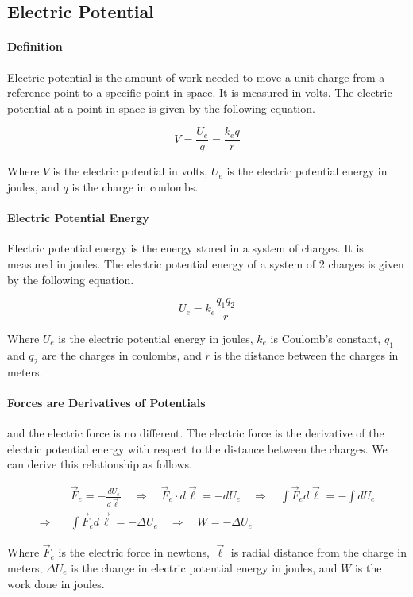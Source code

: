 \subsection{Electric Potential}
\hrulefill

\paragraph*{Definition}
Electric potential is the amount of work needed to move a unit charge from a reference point to a specific point in space.
It is measured in volts. The electric potential at a point in space is given by the following equation.

\begin{equation*}
    V = \frac{U_e}{q} = \frac{k_eq}{r}
\end{equation*}

Where $V$ is the electric potential in volts, $U_e$ is the electric potential energy in joules, and $q$ is the charge in coulombs.

\paragraph*{Electric Potential Energy}
Electric potential energy is the energy stored in a system of charges. It is measured in joules. The electric potential energy of a 
system of 2 charges is given by the following equation.

\begin{equation*}
    U_e = k_e\frac{q_1q_2}{r}
\end{equation*}

Where $U_e$ is the electric potential energy in joules, $k_e$ is Coulomb's constant, $q_1$ and $q_2$ are the charges in coulombs, and $r$ is the distance between the charges in meters.

\paragraph*{Forces are Derivatives of Potentials}
and the electric force is no different. The electric force is the derivative of the electric potential energy with respect to the distance between the charges. 
We can derive this relationship as follows.

\begin{align*}
    &\quad \vec{F}_e = -\frac{dU_e}{d\vec{\ell}} \quad \Rightarrow \quad \vec{F}_e \cdot d\vec{\ell} = -dU_e \quad \Rightarrow \quad \int \vec{F}_e d\vec{\ell} = -\int dU_e\\
    \Rightarrow& \quad \int \vec{F}_e d\vec{\ell} = -\Delta U_e \quad \Rightarrow \quad W = -\Delta U_e
\end{align*}

Where $\vec{F}_e$ is the electric force in newtons, $\vec{\ell}$ is radial distance from the charge in meters, $\Delta{U_e}$ is the change
in electric potential energy in joules, and $W$ is the work done in joules.